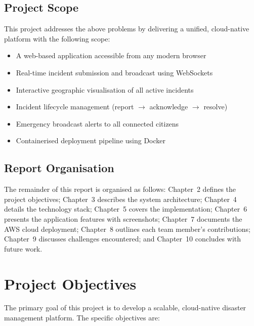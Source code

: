 \documentclass[12pt, a4paper]{report}
\begin{document}
\section{Project Scope}

This project addresses the above problems by delivering a unified, cloud-native platform with the following scope:

\begin{itemize}
  \item A web-based application accessible from any modern browser
  \item Real-time incident submission and broadcast using WebSockets
  \item Interactive geographic visualisation of all active incidents
  \item Incident lifecycle management (report $\rightarrow$ acknowledge $\rightarrow$ resolve)
  \item Emergency broadcast alerts to all connected citizens
  \item Containerised deployment pipeline using Docker
\end{itemize}

\section{Report Organisation}

The remainder of this report is organised as follows: Chapter~2 defines the project objectives; Chapter~3 describes the system architecture; Chapter~4 details the technology stack; Chapter~5 covers the implementation; Chapter~6 presents the application features with screenshots; Chapter~7 documents the AWS cloud deployment; Chapter~8 outlines each team member's contributions; Chapter~9 discusses challenges encountered; and Chapter~10 concludes with future work.

\chapter{Project Objectives}

The primary goal of this project is to develop a scalable, cloud-native disaster management platform. The specific objectives are:
\end{document}
